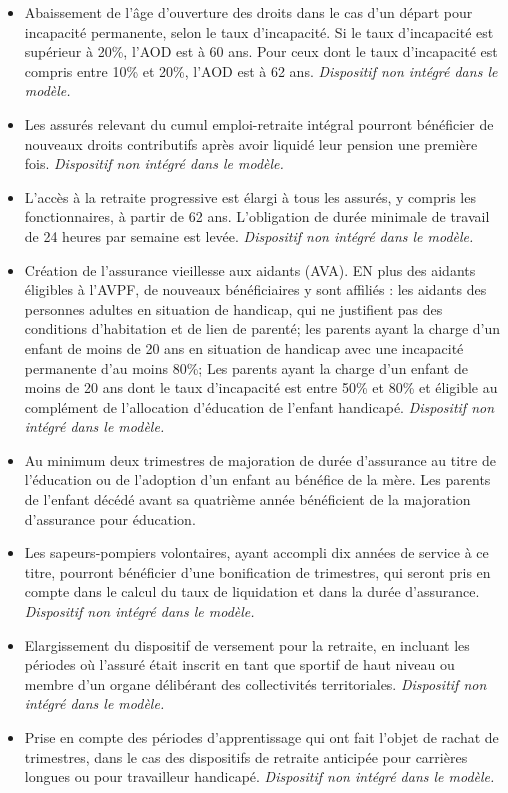 \begin{itemize}
	\item Abaissement de l'âge d'ouverture des droits dans le cas d'un départ pour incapacité permanente, selon le taux d'incapacité. Si le taux d'incapacité est supérieur à 20\%, l'AOD est à 60 ans. Pour ceux dont le taux d'incapacité est compris entre 10\% et 20\%, l'AOD est à 62 ans. \textit{Dispositif non intégré dans le modèle.}
	\item Les assurés relevant du cumul emploi-retraite intégral pourront bénéficier de nouveaux droits contributifs après avoir liquidé leur pension une première fois. \textit{Dispositif non intégré dans le modèle.}
	\item L'accès à la retraite progressive est élargi à tous les assurés, y compris les fonctionnaires, à partir de 62 ans. L'obligation de durée minimale de travail de 24 heures par semaine est levée. \textit{Dispositif non intégré dans le modèle.}
	\item Création de l'assurance vieillesse aux aidants (AVA). EN plus des aidants éligibles à l'AVPF, de nouveaux bénéficiaires y sont affiliés : les aidants des personnes adultes en situation de handicap, qui ne justifient pas des conditions d'habitation et de lien de parenté; les parents ayant la charge d'un enfant de moins de 20 ans en situation de handicap avec une incapacité permanente d'au moins 80\%; Les parents ayant la charge d’un enfant de moins de 20 ans dont le taux d’incapacité est entre 50\% et 80\% et éligible au complément de l’allocation d’éducation de l’enfant handicapé. \textit{Dispositif non intégré dans le modèle.}
	\item Au minimum deux trimestres de majoration de durée d'assurance au titre de l'éducation ou de l'adoption d'un enfant au bénéfice de la mère. Les parents de l'enfant décédé avant sa quatrième année bénéficient de la majoration d'assurance pour éducation.
	\item Les sapeurs-pompiers volontaires, ayant accompli dix années de service à ce titre, pourront bénéficier d’une bonification de trimestres, qui seront pris en compte dans le calcul du taux de liquidation et dans la durée d’assurance. \textit{Dispositif non intégré dans le modèle.}
	\item Elargissement du dispositif de versement pour la retraite, en incluant les périodes où l'assuré était inscrit en tant que sportif de haut niveau ou membre d'un organe délibérant des collectivités territoriales. \textit{Dispositif non intégré dans le modèle.}
	\item Prise en compte des périodes d’apprentissage qui ont fait l’objet de rachat de trimestres, dans le cas des dispositifs de retraite anticipée pour carrières longues ou pour travailleur handicapé. \textit{Dispositif non intégré dans le modèle.}

\end{itemize}
